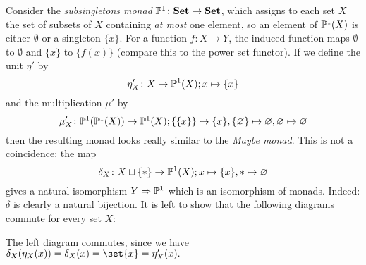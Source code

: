 \begin{example}
    Consider the \textit{subsingletons monad} $\P^1 \colon \cat{Set} \to \cat{Set}$, which
    assigns to each set $X$ the set of subsets of $X$ containing \textit{at most} one element, so
    an element of $\P^1(X)$ is either $\emptyset$ or a singleton $\{x\}$. For a function 
    $f \colon X \to Y$, the induced function maps $\emptyset$ to $\emptyset$ and $\{x\}$ to 
    $\{f(x)\}$ (compare this to the power set functor). If we define the unit $\eta'$ by
    \[
        \eta'_X \colon X \to \P^1(X); x \mapsto \{x\}
    \]
    and the multiplication $\mu'$ by 
    \[
        \mu'_X \colon \P^1(\P^1(X)) \to \P^1(X); \{\{x\}\} \mapsto \{x\},
        \{\emptyset\} \mapsto \emptyset, \emptyset \mapsto \emptyset
    \]
    then the resulting monad looks really similar to the \textit{Maybe monad}. 
    This is not a coincidence: the map
    \[
        \delta_X \colon X \sqcup \pt \to \P^1(X); x \mapsto \{x\}, \ast \mapsto \emptyset
    \]
    gives a natural isomorphism $Y \Rightarrow \P^1$ which is an isomorphism of monads.
    Indeed: $\delta$ is clearly a natural bijection. It is left to show that the following 
    diagrams commute for every set $X$:
    \begin{figure}[H]
    \centering
    \begin{subfigure}{0.4\textwidth}
    \centering
    \end{subfigure}
    \hspace{2em}
    \begin{subfigure}{0.4\textwidth}
    \centering
    \end{subfigure}
    \end{figure}
    The left diagram commutes, since we have $\delta_X(\eta_X(x))=\delta_X(x)=\set{x}=\eta'_X(x).$

\end{example}
